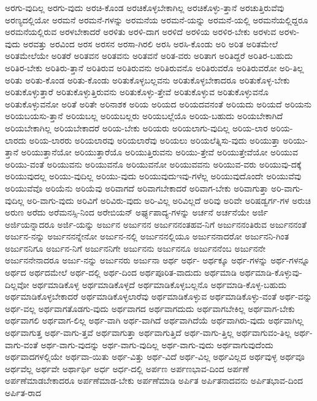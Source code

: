 {ಅರಗು-ವುದಿಲ್ಲ
ಅರಗು-ವುದು
ಅರಚಿ-ಕೊಂಡ
ಅರಚಿಕೊಳ್ಳಬೇಕಾಗಿಲ್ಲ
ಅರಚಿಕೊಳ್ಳು-ತ್ತಾನೆ
ಅರಚುತ್ತಿರುವೆವು
ಅರಣ್ಯದಲ್ಲಿಯೋ
ಅರಮನೆ
ಅರಮನೆ-ಗಳನ್ನು
ಅರಮನೆಯ
ಅರಮನೆ-ಯನ್ನು
ಅರಮನೆ-ಯಲ್ಲಿ
ಅರಮನೆಯಲ್ಲಿದ್ದರೂ
ಅರಮನೆಯಲ್ಲಿರುವ
ಅರಳಬೇಕಾದರೆ
ಅರಳಿತು
ಅರಳಿ-ದಾಗ
ಅರಳಿದೆ
ಅರಳಿಯ
ಅರಳಿರ-ಬೇಕು
ಅರಳುವ
ಅರಳು-ವುದು
ಅರವತ್ತು
ಅರವಿಂದ
ಅರಸ
ಅರಸನ
ಅರಸಾ-ಗಿರಲಿ
ಅರಸಿ
ಅರಸಿ-ಕೊಂಡು
ಅರಿ
ಅರಿತ
ಅರಿತಮೇಲೆ
ಅರಿತಮೇಲೆಯೇ
ಅರಿತರೆ
ಅರಿತವನ
ಅರಿತವನು
ಅರಿತವನೆ
ಅರಿತ-ವರು
ಅರಿತಾಗ
ಅರಿತಿದ್ದರೆ
ಅರಿತಿರ-ಬಹುದು
ಅರಿತಿರ-ಬೇಕು
ಅರಿತಿರು-ತ್ತಾನೆ
ಅರಿತಿರುವ
ಅರಿತಿರುವನು
ಅರಿತಿರುವನೊ
ಅರಿತಿರುವರೊ
ಅರಿತಿರುವರೋ
ಅರಿ-ತಿಲ್ಲ
ಅರಿತು
ಅರಿತು-ಕೊಂಡ
ಅರಿತು-ಕೊಂಡು
ಅರಿತುಕೊಳ್ಳಬಲ್ಲವನು
ಅರಿತುಕೊಳ್ಳಬೇಕಾದರೂ
ಅರಿತುಕೊಳ್ಳ-ಬೇಕು
ಅರಿತುಕೊಳ್ಳುತ್ತಾರೆ
ಅರಿತುಕೊಳ್ಳುತ್ತಿರುವನು
ಅರಿತುಕೊಳ್ಳು-ತ್ತೇವೆ
ಅರಿತುಕೊಳ್ಳುವ
ಅರಿತುಕೊಳ್ಳುವನೊ
ಅರಿತುಕೊಳ್ಳುವನೋ
ಅರಿತೆ
ಅರಿತೇ
ಅರಿನಾಶಕ
ಅರಿಯ
ಅರಿಯದ
ಅರಿಯದವನಂತೆ
ಅರಿಯದು
ಅರಿಯದೆ
ಅರಿಯನು
ಅರಿಯಬಯಸು-ತ್ತಾನೆ
ಅರಿಯಬಲ್ಲ
ಅರಿಯಬಲ್ಲರು
ಅರಿಯಬಲ್ಲೆಯೊ
ಅರಿಯ-ಬಹುದು
ಅರಿಯಬೇಕಾಗಿದೆ
ಅರಿಯಬೇಕಾಗಿಲ್ಲ
ಅರಿಯಬೇಕಾದರೆ
ಅರಿಯ-ಬೇಕು
ಅರಿಯರು
ಅರಿಯಲಾಗು-ವುದಿಲ್ಲ
ಅರಿಯ-ಲಾರ
ಅರಿಯ-ಲಾರದು
ಅರಿಯ-ಲಾರರು
ಅರಿಯಲಾರವು
ಅರಿಯಲಾರೆವು
ಅರಿಯಲು
ಅರಿಯಲೆತ್ನಿಸು-ವುದು
ಅರಿಯುತ್ತಾ
ಅರಿಯು-ತ್ತಾನೆ
ಅರಿಯುತ್ತಾನೆಯೋ
ಅರಿಯುತ್ತಾರೆಯೊ
ಅರಿಯುತ್ತಿರುವನು
ಅರಿಯು-ತ್ತೇವೆ
ಅರಿಯುತ್ತೇವೆಯೋ
ಅರಿಯುವ
ಅರಿಯು-ವಂತೆ
ಅರಿಯುವನು
ಅರಿಯುವನೊ
ಅರಿಯುವನೋ
ಅರಿಯುವವನು
ಅರಿಯುವ-ವರು
ಅರಿಯುವು-ದಕ್ಕೆ
ಅರಿಯುವುದಲ್ಲ
ಅರಿಯು-ವುದಿಲ್ಲ
ಅರಿಯು-ವುದು
ಅರಿಯುವುದುಇವು-ಗಳೆಲ್ಲ
ಅರಿಯುವುದೊಂದೇ
ಅರಿಯುವೆವು
ಅರಿಯುವೆವೊ
ಅರಿಯೆನು
ಅರಿಯೆವು
ಅರಿವಾಗದೆ
ಅರಿವಾಗಬೇಕಾದರೆ
ಅರಿವಾಗ-ಬೇಕು
ಅರಿವಾಗುತ್ತಾ
ಅರಿ-ವಾಗು-ವುದಿಲ್ಲ
ಅರಿ-ವಾಗು-ವುದು
ಅರಿವಿಗೆ
ಅರಿವಿರು-ವುದು
ಅರಿ-ವಿಲ್ಲ
ಅರಿವಿಲ್ಲದೆ
ಅರಿವು
ಅರಿವೇ
ಅರಿಷಡ್ವರ್ಗ-ಗಳ
ಅರುಚಿ
ಅರುಣ
ಅರೆದು
ಅರೆಮನಸ್ಸಿ-ನಿಂದ
ಅರೇಬಿಯನ್
ಅರ್ಘ್ಯಪಾದ್ಯ-ಗಳನ್ನು
ಅರ್ಚನೆ
ಅರ್ಚನೆಯೇ
ಅರ್ಜಿ
ಅರ್ಜಿಯನ್ನಾದರೂ
ಅರ್ಜಿ-ಯನ್ನು
ಅರ್ಜುನ
ಅರ್ಜುನನ
ಅರ್ಜುನನಂತಹವ-ನಿಗೆ
ಅರ್ಜುನನಂತಿರುವ
ಅರ್ಜುನನಂತೆ
ಅರ್ಜುನ-ನನ್ನು
ಅರ್ಜುನನನ್ನೇನೋ
ಅರ್ಜುನ-ನಲ್ಲಿ
ಅರ್ಜುನನಲ್ಲಿಯೂ
ಅರ್ಜುನನಾದರೋ
ಅರ್ಜುನನಿ-ಗಿಂತ
ಅರ್ಜುನನಿಗೂ
ಅರ್ಜುನ-ನಿಗೆ
ಅರ್ಜುನನಿಗೇ
ಅರ್ಜುನನು
ಅರ್ಜುನನೂ
ಅರ್ಜುನನೆಂಬ
ಅರ್ಜುನನೇ
ಅರ್ಜುನನೇನಾದರೂ
ಅರ್ಜು-ನನ್ನು
ಅರ್ಜುನರು
ಅರ್ಜುನಾ
ಅರ್ಥ
ಅರ್ಥ-
ಅರ್ಥಕ್ಕೂ
ಅರ್ಥ-ಗಳನ್ನು
ಅರ್ಥ-ಗಳನ್ನೂ
ಅರ್ಥದ
ಅರ್ಥದಮೇಲೆ
ಅರ್ಥ-ದಲ್ಲಿ
ಅರ್ಥ-ದಿಂದ
ಅರ್ಥಪೂರಿತ-ವಾದುದು
ಅರ್ಥಮಾಡಿ
ಅರ್ಥಮಾಡಿ-ಕೊಳ್ಳುವು-ದಿಲ್ಲವೋ
ಅರ್ಥಮಾಡಿಕೊಳ್ಳ
ಅರ್ಥಮಾಡಿಕೊಳ್ಳದೆ
ಅರ್ಥಮಾಡಿಕೊಳ್ಳಬಲ್ಲನೊ
ಅರ್ಥಮಾಡಿ-ಕೊಳ್ಳ-ಬಹುದು
ಅರ್ಥಮಾಡಿಕೊಳ್ಳಬೇಕಾದರೆ
ಅರ್ಥಮಾಡಿಕೊಳ್ಳಲಾರೆವು
ಅರ್ಥಮಾಡಿಕೊಳ್ಳುವ
ಅರ್ಥಮಾಡಿಕೊಳ್ಳು-ವಂತೆ
ಅರ್ಥ-ವನ್ನು
ಅರ್ಥ-ವಲ್ಲ
ಅರ್ಥವಾಗತೊಡಗು-ವುದು
ಅರ್ಥವಾಗದ
ಅರ್ಥವಾಗದುದು
ಅರ್ಥವಾಗಬೇಕಿಲ್ಲ
ಅರ್ಥವಾಗ-ಬೇಕು
ಅರ್ಥವಾಗಲಿ
ಅರ್ಥವಾಗ-ಲಿಲ್ಲ
ಅರ್ಥ-ವಾಗಿ
ಅರ್ಥ-ವಾಗಿದೆ
ಅರ್ಥವಾಗಿದೆಯೆ
ಅರ್ಥವಾಗಿರು-ವುದು
ಅರ್ಥವಾಗಿಲ್ಲ
ಅರ್ಥವಾಗುತ್ತ
ಅರ್ಥ-ವಾಗು-ತ್ತವೆ
ಅರ್ಥವಾಗುತ್ತಾ
ಅರ್ಥವಾಗುತ್ತಿದೆ
ಅರ್ಥ-ವಾಗು-ತ್ತಿಲ್ಲ
ಅರ್ಥವಾಗುವಂ-ತಿಲ್ಲ
ಅರ್ಥ-ವಾಗು-ವಂತೆ
ಅರ್ಥ-ವಾಗು-ವುದನ್ನು
ಅರ್ಥ-ವಾಗು-ವುದಿಲ್ಲ
ಅರ್ಥ-ವಾಗು-ವುದು
ಅರ್ಥವಾಗುವುದೆಂದು
ಅರ್ಥವಾದಗಳಲ್ಲಿಯೇ
ಅರ್ಥವಾ-ಯಿತು
ಅರ್ಥ-ವಿತ್ತು
ಅರ್ಥ-ವಿದೆ
ಅರ್ಥ-ವಿಲ್ಲ
ಅರ್ಥವಿಲ್ಲದ
ಅರ್ಥವುಳ್ಳ
ಅರ್ಥವೂ
ಅರ್ಥವೆಲ್ಲ
ಅರ್ಥವೇ
ಅರ್ಥಾರ್ಥಿ
ಅರ್ಧ
ಅರ್ಧ-ದಲ್ಲಿ
ಅರ್ಪಣ
ಅರ್ಪಣಭಾವ-ದಿಂದ
ಅರ್ಪಣೆ
ಅರ್ಪಣೆಮಾಡಬೇಕಾದರೂ
ಅರ್ಪಣೆಮಾಡ-ಬೇಕು
ಅರ್ಪಣೆಮಾಡಿ
ಅರ್ಪಿತ
ಅರ್ಪಿತನಾದವನು
ಅರ್ಪಿತಭಾವ-ದಿಂದ
ಅರ್ಪಿತ-ರಾದ
}
